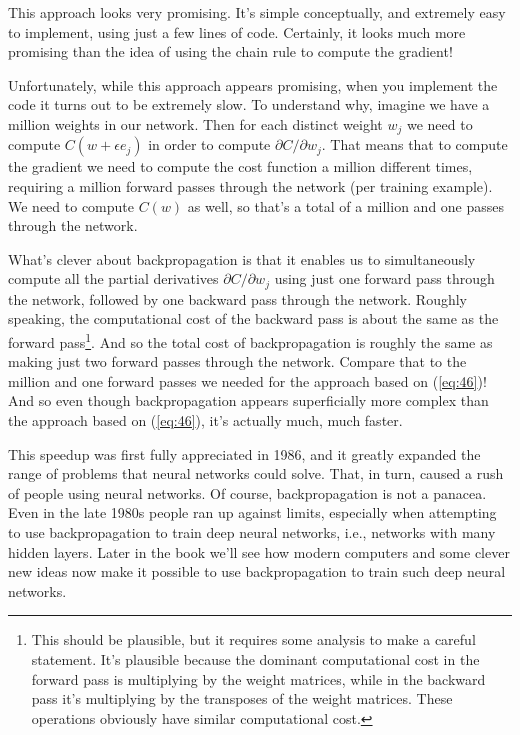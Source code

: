 \documentclass[a4paper,twoside,10pt]{book}
\begin{document}
This approach looks very promising. It's simple conceptually, and extremely easy to implement, using just a few lines of code. Certainly, it looks much more promising than the idea of using the chain rule to compute the gradient!

Unfortunately, while this approach appears promising, when you implement the code it turns out to be extremely slow. To understand why, imagine we have a million weights in our network. Then for each distinct weight $w_j$ we need to compute $C(w+\epsilon{}e_j)$ in order to compute $\partial{}C/\partial{}w_j$. That means that to compute the gradient we need to compute the cost function a million different times, requiring a million forward passes through the network (per training example). We need to compute $C(w)$ as well, so that's a total of a million and one passes through the network.

What's clever about backpropagation is that it enables us to simultaneously compute all the partial derivatives $\partial{}C/\partial{}w_j$ using just one forward pass through the network, followed by one backward pass through the network. Roughly speaking, the computational cost of the backward pass is about the same as the forward pass\footnote{This should be plausible, but it requires some analysis to make a careful statement. It's plausible because the dominant computational cost in the forward pass is multiplying by the weight matrices, while in the backward pass it's multiplying by the transposes of the weight matrices. These operations obviously have similar computational cost.}. And so the total cost of backpropagation is roughly the same as making just two forward passes through the network. Compare that to the million and one forward passes we needed for the approach based on (\ref{eq:46})! And so even though backpropagation appears superficially more complex than the approach based on (\ref{eq:46}), it's actually much, much faster.

This speedup was first fully appreciated in 1986, and it greatly expanded the range of problems that neural networks could solve. That, in turn, caused a rush of people using neural networks. Of course, backpropagation is not a panacea. Even in the late 1980s people ran up against limits, especially when attempting to use backpropagation to train deep neural networks, i.e., networks with many hidden layers. Later in the book we'll see how modern computers and some clever new ideas now make it possible to use backpropagation to train such deep neural networks.
%
\end{document}
